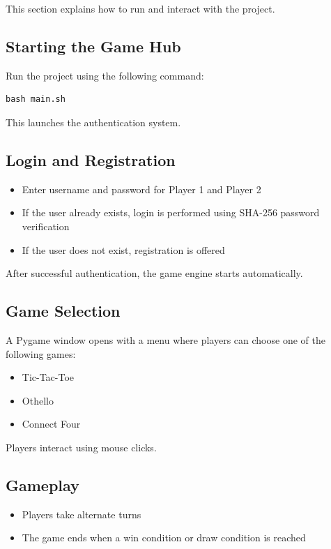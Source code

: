 \documentclass[12pt,a4paper]{article}
\begin{document}
This section explains how to run and interact with the project.

\subsection{Starting the Game Hub}
Run the project using the following command:

\begin{verbatim}
bash main.sh
\end{verbatim}

This launches the authentication system.

\subsection{Login and Registration}
\begin{itemize}
    \item Enter username and password for Player 1 and Player 2
    \item If the user already exists, login is performed using SHA-256 password verification
    \item If the user does not exist, registration is offered
\end{itemize}

After successful authentication, the game engine starts automatically.

\subsection{Game Selection}
A Pygame window opens with a menu where players can choose one of the following games:
\begin{itemize}
    \item Tic-Tac-Toe
    \item Othello
    \item Connect Four
\end{itemize}

Players interact using mouse clicks.

\subsection{Gameplay}
\begin{itemize}
    \item Players take alternate turns
    \item The game ends when a win condition or draw condition is reached
\end{itemize}
\end{document}
